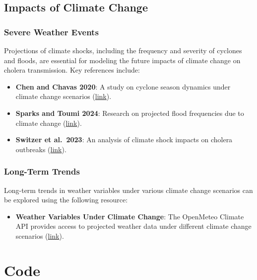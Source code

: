 \documentclass[
]{book}
\providecommand{\tightlist}{%
  \setlength{\itemsep}{0pt}\setlength{\parskip}{0pt}}
\begin{document}
\section{Impacts of Climate Change}\label{impacts-of-climate-change-1}

\subsection{Severe Weather Events}\label{severe-weather-events}

Projections of climate shocks, including the frequency and severity of cyclones and floods, are essential for modeling the future impacts of climate change on cholera transmission. Key references include:

\begin{itemize}
\tightlist
\item
  \textbf{Chen and Chavas 2020}: A study on cyclone season dynamics under climate change scenarios (\href{https://journals.ametsoc.org/view/journals/atsc/77/8/jasD190320.xml}{link}).
\item
  \textbf{Sparks and Toumi 2024}: Research on projected flood frequencies due to climate change (\href{https://www.nature.com/articles/s41597-024-03250-y}{link}).
\item
  \textbf{Switzer et al.~2023}: An analysis of climate shock impacts on cholera outbreaks (\href{https://www.nature.com/articles/s43247-023-00844-z}{link}).
\end{itemize}

\subsection{Long-Term Trends}\label{long-term-trends}

Long-term trends in weather variables under various climate change scenarios can be explored using the following resource:

\begin{itemize}
\tightlist
\item
  \textbf{Weather Variables Under Climate Change}: The OpenMeteo Climate API provides access to projected weather data under different climate change scenarios (\href{https://open-meteo.com/en/docs/climate-api}{link}).
\end{itemize}

\chapter{Code}\label{code}
\end{document}
